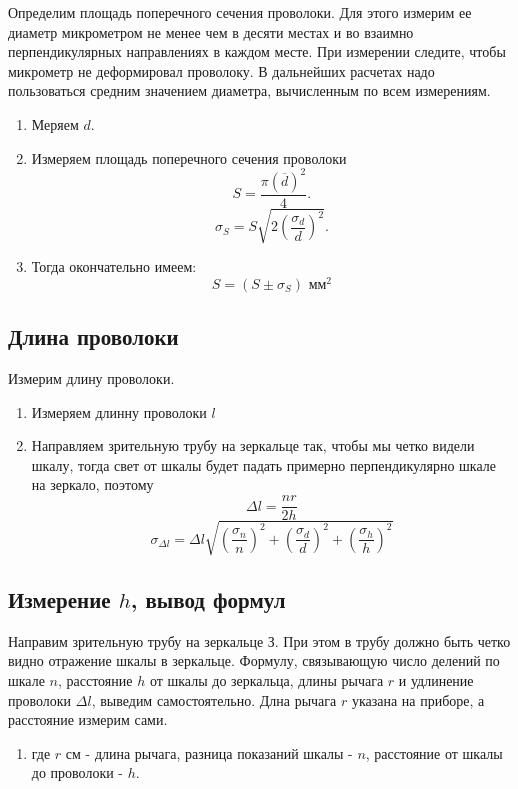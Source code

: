 \documentclass[a4paper, 12pt]{article}%
\begin{document}
Определим площадь поперечного сечения проволоки. Для этого измерим ее диаметр микрометром не менее чем в десяти местах и во взаимно перпендикулярных направлениях в каждом месте. При измерении следите, чтобы микрометр не деформировал проволоку. В дальнейших расчетах надо пользоваться средним значением диаметра, вычисленным по всем измерениям.

\begin{enumerate}
\item Меряем $d$.
\item Измеряем площадь поперечного сечения проволоки
\[S =\dfrac{ \pi (\overline{d})^2}{4}.\]
\[\sigma_S = S\sqrt{2\left( \dfrac{\sigma_d}{d}\right) ^2}.\]

\item Тогда окончательно имеем:
\[S = (S \pm\sigma_S) \text{ мм}^2\]
\end{enumerate}

\subsection{Длина проволоки}

Измерим длину проволоки.

\begin{enumerate}
\item Измеряем длинну проволоки $l$
\item Направляем зрительную трубу на зеркальце так, чтобы мы четко видели шкалу, тогда свет от шкалы будет падать примерно перпендикулярно шкале на зеркало, поэтому
\[\Delta l =\dfrac{nr}{2h}\]
\[ \sigma_{\Delta l} = \Delta l\sqrt{\left( \dfrac{\sigma_{n}}{n}\right)^2 + \left(\dfrac{\sigma_d}{d}\right)^2+\left(\dfrac{\sigma_h}{h}\right)^2} \]
\end{enumerate}

\subsection{Измерение $h$, вывод формул}

Направим зрительную трубу на зеркальце З. При этом в трубу должно быть четко видно отражение шкалы в зеркальце. Формулу, связывающую число делений по шкале $n$, расстояние $h$ от шкалы до зеркальца, длины рычага $r$ и удлинение проволоки $\Delta l$, выведим самостоятельно. Длна рычага $r$ указана на приборе, а расстояние измерим сами.

\begin{enumerate}

\item где $r$ см - длина рычага, разница показаний шкалы - $n$, расстояние от шкалы до проволоки - $h$.

\end{enumerate}
\end{document}
